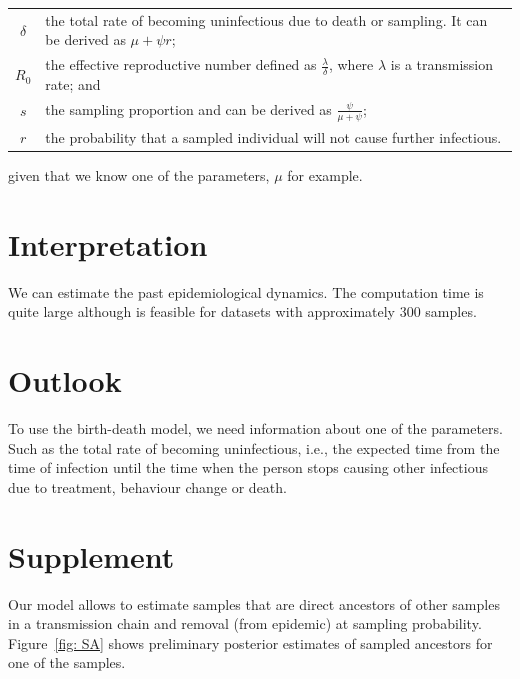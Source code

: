 \documentclass[12pt]{article}
\begin{document}
\begin{tabular} {cp{}}
$\delta$ & the total rate of becoming uninfectious due to death or sampling. It can be derived as  $\mu + \psi r$; \\

$R_0$ & the effective reproductive number defined as $\frac \lambda \delta$, where $\lambda$ is a transmission rate; and \\

$s$ & the sampling proportion and can be derived as $\frac \psi {\mu + \psi}$; \\

$r$ & the probability that a sampled individual will not cause further infectious. 
\end{tabular}

\vskip2mm

\noindent given that we know one of the parameters, $\mu$ for example.  

\section{Interpretation}

We can estimate the past epidemiological dynamics. The computation time is quite large although is feasible for datasets with approximately 300 samples. 



\section{Outlook}

To use the birth-death model, we need information about one of the parameters. Such as the total rate of becoming uninfectious, i.e., the expected time from the time of infection until the time when the person stops causing other infectious due to treatment, behaviour change or death. 

\section{Supplement}

Our model allows to estimate samples that are direct ancestors of other samples in a transmission chain and removal (from epidemic) at sampling probability. Figure~\ref{fig: SA} shows preliminary posterior estimates of sampled ancestors for one of the samples.  
\end{document}
